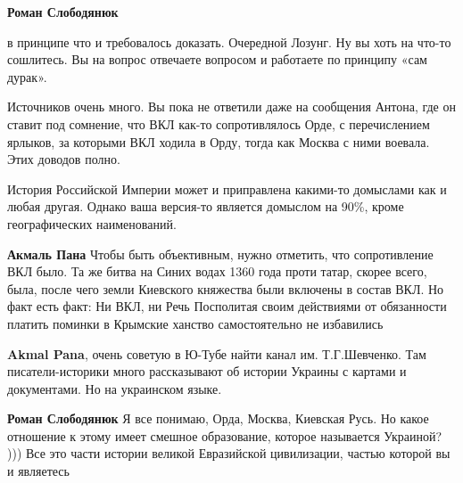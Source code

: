 \begin{itemize}
\begin{itemize}
\textbf{Роман Слободянюк} 

в принципе что и требовалось доказать. Очередной Лозунг. Ну вы хоть на что-то
сошлитесь. Вы на вопрос отвечаете вопросом и работаете по принципу «сам дурак».

Источников очень много. Вы пока не ответили даже на сообщения Антона, где он
ставит под сомнение, что ВКЛ как-то сопротивлялось Орде, с перечислением
ярлыков, за которыми ВКЛ ходила в Орду, тогда как Москва с ними воевала. Этих
доводов полно.

История Российской Империи может и приправлена какими-то домыслами как и любая
другая. Однако ваша версия-то является домыслом на 90\%, кроме географических
наименований.

 
\textbf{Акмаль Пана} Чтобы быть объективным, нужно отметить, что сопротивление ВКЛ было. Та же битва на Синих водах 1360 года проти татар, скорее всего, была, после чего земли Киевского княжества были включены в состав ВКЛ. Но факт есть факт: Ни ВКЛ, ни Речь Посполитая своим действиями от обязанности платить поминки в Крымские ханство самостоятельно не избавились

 
\textbf{Akmal Pana}, очень советую в Ю-Тубе найти канал им. Т.Г.Шевченко. Там писатели-историки много рассказывают об истории Украины с картами и документами. Но на украинском языке.

 
\textbf{Роман Слободянюк} Я все понимаю, Орда, Москва, Киевская Русь. Но какое отношение к этому имеет смешное образование, которое называется Украиной? ))) Все это части истории великой Евразийской цивилизации, частью которой вы и являетесь

 

\end{itemize}
\end{itemize}
